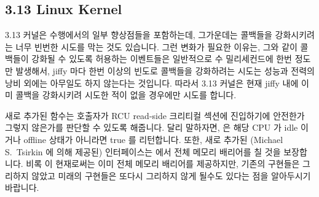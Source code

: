 \subsection{3.13 Linux Kernel}

3.13 커널은  수행에서의 일부 향상점들을 포함하는데,
그가운데는 콜백들을 강화시키려는 너무 빈번한 시도를 막는 것도 있습니다.
그런 변화가 필요한 이유는, 그와 같이 콜백들이 강화될 수 있도록 허용하는
이벤트들은 일반적으로 수 밀리세컨드에 한번 정도만 발생해서, jiffy 마다 한번
이상의 빈도로 콜백들을 강화하려는 시도는 성능과 전력의 낭비 외에는 아무일도
하지 않는다는 것입니다.
따라서 3.13 커널은 현재 jiffy 내에 이미 콜백을 강화시키려 시도한 적이 없을
경우에만 시도를 합니다.

새로 추가된  함수는 호출자가 RCU read-side 크리티컬
섹션에 진입하기에 안전한가 그렇지 않은가를 판단할 수 있도록 해줍니다.
달리 말하자면,  은 해당 CPU 가 idle 이거나 offline 상태가
아니라면 true 를 리턴합니다.
또한, 새로 추가된 (Michael S.~Tsirkin 에 의해 제공된)
 인터페이스는  에서
전체 메모리 배리어를 칠 것을 보장합니다.
비록  이 현재로써는 이미 전체 메모리 배리어를
제공하지만, 기존의 구현들은 그리하지 않았고 미래의 구현들은 또다시 그리하지
않게 될수도 있다는 점을 알아두시기 바랍니다.

